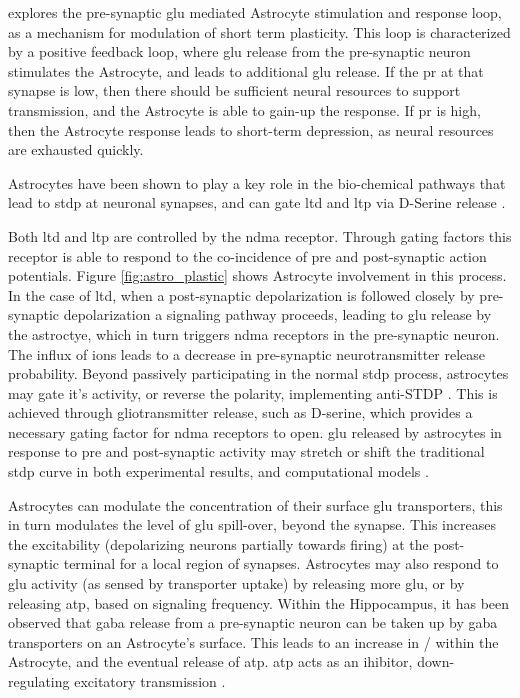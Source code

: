     \parencite{pitta_2012} explores the pre-synaptic \Gls{glu} mediated Astrocyte
    stimulation and response loop, as a mechanism for modulation of short term
    plasticity. This loop is characterized by a positive feedback loop, where
    \Gls{glu} release from the pre-synaptic neuron stimulates the Astrocyte, and
    leads to additional \Gls{glu} release. If the \acrshort{pr} at that synapse
    is low, then there should be sufficient neural resources to support
    transmission, and the Astrocyte is able to gain-up the response. If
    \acrshort{pr} is high, then the Astrocyte response leads to short-term
    depression, as neural resources are exhausted quickly.

    Astrocytes have been shown to play a key role in the bio-chemical pathways
    that lead to \Gls{stdp} at neuronal synapses, and can gate \Gls{ltd} and \Gls{ltp} via D-Serine
    release \cite{manninen_2019}.

    Both \Gls{ltd} and \Gls{ltp} are controlled by the \Gls{ndma}
    receptor. Through gating factors this receptor is able to respond to the
    co-incidence of pre and post-synaptic action potentials. Figure
    \ref{fig:astro_plastic} shows Astrocyte involvement in this process. In the
    case of \Gls{ltd}, when a post-synaptic depolarization is followed closely
    by pre-synaptic depolarization a signaling pathway proceeds, leading to
    \Gls{glu} release by the astroctye, which in turn triggers \Gls{ndma}
    receptors in the pre-synaptic neuron. The influx of ions leads to a decrease
    in pre-synaptic neurotransmitter release probability. Beyond passively
    participating in the normal \Gls{stdp} process, astrocytes may gate it's
    activity, or reverse the polarity, implementing anti-STDP
    \cite{min_2012}. This is achieved through gliotransmitter release, such as
    D-serine, which provides a necessary gating factor for \Gls{ndma} receptors
    to open. \Gls{glu} released by astrocytes in response to pre and
    post-synaptic activity may stretch or shift the traditional \Gls{stdp} curve
    in both experimental results, and computational models \cite{pitta_2016}.

    Astrocytes can modulate the concentration of their surface glu transporters,
    this in turn modulates the level of glu spill-over, beyond the synapse. This
    increases the excitability (depolarizing neurons partially towards firing)
    at the post-synaptic terminal for a local region of synapses. Astrocytes may
    also respond to \Gls{glu} activity (as sensed by transporter uptake) by
    releasing more \Gls{glu}, or by releasing \Gls{atp}, based on signaling
    frequency. Within the Hippocampus, it has been observed that \Gls{gaba}
    release from a pre-synaptic neuron can be taken up by \Gls{gaba}
    transporters on an Astrocyte's surface. This leads to an increase in \na /
    \ca within the Astrocyte, and the eventual release of \Gls{atp}. \Gls{atp}
    acts as an ihibitor, down-regulating excitatory transmission
    \cite{mederos_2018}.
        

